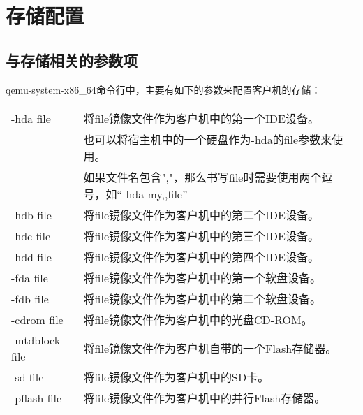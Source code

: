 \documentclass[a4paper,left=2.5cm,right=2.5cm,11pt]{article}
\newcommand{\interval}{\vspace{0.5em}}
\begin{document}
\tableofcontents

\clearpage

\section{存储配置}
\subsection{与存储相关的参数项}
	qemu-system-x86\_64命令行中，主要有如下的参数来配置客户机的存储：
	\interval
	\begin{longtable}{p{2.3cm}p{10cm}}
	\hline
	-hda file & 将file镜像文件作为客户机中的第一个IDE设备。 \\
			  & 也可以将宿主机中的一个硬盘作为-hda的file参数来使用。\\
			  & 如果文件名包含","，那么书写file时需要使用两个逗号，如“-hda my,,file” \\
	\hline
	-hdb file & 将file镜像文件作为客户机中的第二个IDE设备。 \\
	\hline
	-hdc file & 将file镜像文件作为客户机中的第三个IDE设备。 \\
	\hline
	-hdd file & 将file镜像文件作为客户机中的第四个IDE设备。 \\
	\hline
	-fda file & 将file镜像文件作为客户机中的第一个软盘设备。 \\
	\hline
	-fdb file & 将file镜像文件作为客户机中的第二个软盘设备。 \\
	\hline
	-cdrom file & 将file镜像文件作为客户机中的光盘CD-ROM。 \\
	\hline
	-mtdblock file & 将file镜像文件作为客户机自带的一个Flash存储器。 \\
	\hline
	-sd file & 将file镜像文件作为客户机中的SD卡。 \\
	\hline
	-pflash file & 将file镜像文件作为客户机中的并行Flash存储器。 \\
	\hline
	\end{longtable}
	
\end{document}
